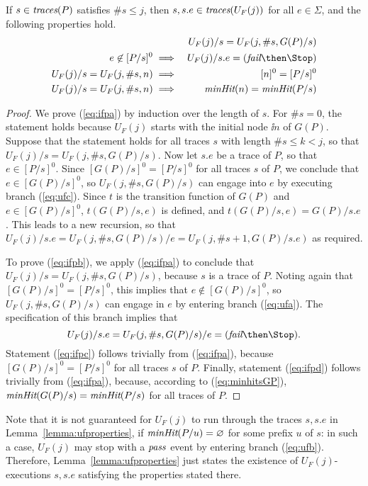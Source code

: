 \begin{lemma}\label{lemma:ufproperties}
If $s\in\text{\it traces}(P)$ satisfies $\#s\le j$, then
$s, s.e\in\text{\it traces}(U_F(j))$ for all $e\in\Sigma$, and the following properties hold.
\begin{eqnarray}
\label{eq:ifpa}
  &  & U_F(j)/s = U_F(j,\#s,G(P)/s)
\\
\label{eq:ifpb}
e\not\in [P/s]^0 & \implies & U_F(j)/s.e = (\efail\then\Stop)
\\
\label{eq:ifpc}
U_F(j)/s = U_F(j,\# s,n)  & \implies & [n]^0 = [P/s]^0
\\
\label{eq:ifpd}
U_F(j)/s = U_F(j,\# s,n)  & \implies & \minhits(n) = \minhits(P/s)
\end{eqnarray}
\end{lemma}
\begin{proof}
We prove (\ref{eq:ifpa}) by induction over the length of $s$. For $\#s = 0$,
the statement holds because $U_F(j)$ starts with the initial node $\ii n$ of
$G(P)$. Suppose that the statement holds for all traces $s$ with length $\# s
\le k < j$, so that $U_F(j)/s = U_F(j,\#s,G(P)/s)$. Now let $s.e$ be a trace
of $P$, so that $e\in [P/s]^0$. Since $[G(P)/s]^0 = [P/s]^0$ for all traces
$s$ of $P$, we conclude that $e\in  [G(P)/s]^0$, so $U_F(j,\#s,G(P)/s)$ can
engage into $e$ by executing branch (\ref{eq:ufc}). Since $t$ is the
transition function of $G(P)$ and $e\in [G(P)/s]^0$, $t(G(P)/s,e)$ is
defined, and $t(G(P)/s,e) = G(P)/s.e$. This leads to a new recursion, so that
$U_F(j)/s.e = U_F(j,\#s,G(P)/s)/e = U_F(j,\#s+1,G(P)/s.e)$ as required.

To prove (\ref{eq:ifpb}), we apply (\ref{eq:ifpa}) to conclude that $U_F(j)/s
= U_F(j,\#s,G(P)/s)$, because $s$ is a trace of $P$. Noting again that
$[G(P)/s]^0 = [P/s]^0$, this implies that $e\not\in [G(P)/s]^0$, so
$U_F(j,\#s,G(P)/s)$ can engage in $e$ by entering branch (\ref{eq:ufa}). The
specification of this branch implies that
$$
U_F(j)/s.e = U_F(j,\#s,G(P)/s)/e = (\efail\then\Stop).
$$
%
Statement (\ref{eq:ifpc}) follows trivially from (\ref{eq:ifpa}), because
$[G(P)/s]^0 = [P/s]^0$ for all traces $s$ of $P$. Finally, statement
(\ref{eq:ifpd}) follows trivially from (\ref{eq:ifpa}), because, according to
(\ref{eq:minhitsGP}), $\text{\it minHit}(G(P)/s) = \text{\it minHit}(P/s)$ for all traces of
$P$. \xbox
\end{proof}
%
Note that it is not guaranteed for $U_F(j)$ to run through the traces $s,
s.e$ in Lemma~\ref{lemma:ufproperties}, if $\text{\it minHit}(P/u) = \varnothing$ for
some prefix $u$ of $s$: in such a case, $U_F(j)$ may stop with a ${\text{\it pass}}$
event by entering branch (\ref{eq:ufb}). Therefore,
Lemma~\ref{lemma:ufproperties} just states the existence of
$U_F(j)$-executions $s, s.e$ satisfying the properties stated there.

